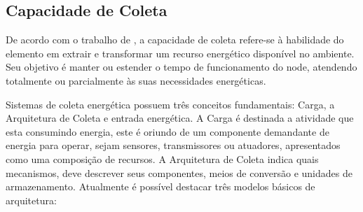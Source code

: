 





\subsection{Capacidade de Coleta}\label{Capacidade de Coleta}
De acordo com o trabalho de \cite{sudevalayam_energy_2011}, a capacidade de coleta refere-se à habilidade do elemento em extrair e transformar um recurso energético disponível no ambiente. Seu objetivo é manter ou estender o tempo de funcionamento do node, atendendo totalmente ou parcialmente às suas necessidades energéticas.

Sistemas de coleta energética possuem três conceitos fundamentais: Carga, a Arquitetura de Coleta e entrada energética. A Carga é destinada a atividade que esta consumindo energia, este é oriundo de um componente demandante de energia para operar, sejam sensores, transmissores ou  atuadores, apresentados como uma composição de recursos. A Arquitetura de Coleta indica quais mecanismos, deve descrever seus componentes, meios de conversão e unidades de armazenamento. Atualmente é possível destacar três modelos básicos de arquitetura:

